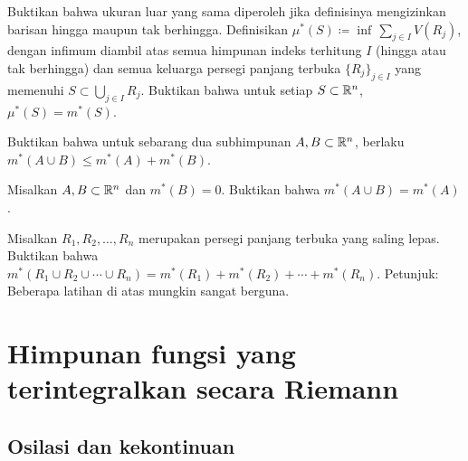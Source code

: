 \begin{exercise} \label{exercise:allowfiniteseqsinoutermeasure}
Buktikan bahwa ukuran luar yang sama diperoleh jika definisinya mengizinkan
barisan hingga maupun tak berhingga. Definisikan
$\mu^*(S)\coloneqq\inf\,\sum_{j\in I}V(R_j)$, dengan infimum diambil atas semua
himpunan indeks terhitung $I$ (hingga atau tak berhingga) dan semua keluarga
persegi panjang terbuka $\{R_j\}_{j\in I}$ yang memenuhi
$S\subset\bigcup_{j\in I}R_j$. Buktikan bahwa untuk setiap $S\subset{\mathbb{R}}^n$,
$\mu^*(S)=m^*(S)$.
\end{exercise}

\begin{exercise}
Buktikan bahwa untuk sebarang dua subhimpunan $A,B\subset{\mathbb{R}}^n$, berlaku
$m^*(A\cup B)\leq m^*(A)+m^*(B)$.
\end{exercise}

\begin{exercise}
Misalkan $A,B\subset{\mathbb{R}}^n$ dan $m^*(B)=0$. Buktikan bahwa
$m^*(A\cup B)=m^*(A)$.
\end{exercise}

\begin{exercise}[Menantang] \label{exercise:outermeasureofsumofrectangles}
Misalkan $R_1,R_2,\ldots,R_n$ merupakan persegi panjang terbuka yang saling
lepas. Buktikan bahwa
$m^*(R_1\cup R_2\cup\cdots\cup R_n)
=m^*(R_1)+m^*(R_2)+\cdots+m^*(R_n)$.
Petunjuk: Beberapa latihan di atas mungkin sangat berguna.
\end{exercise}



\sectionnewpage
\section{Himpunan fungsi yang terintegralkan secara Riemann}
\label{sec:riemannlebesgue}



\subsection{Osilasi dan kekontinuan}

